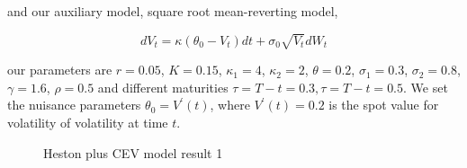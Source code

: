 \noindent and our auxiliary model, square root mean-reverting model,

$$
d V_t=\kappa(\theta_0 - V_t) d t+\sigma_0 \sqrt{V_t} d W_t
$$

\noindent our parameters are $r=0.05$, $K=0.15$, $\kappa_1=4$, $\kappa_2=2$, $\theta=0.2$, $\sigma_1=0.3$, $\sigma_2=0.8$, $\gamma=1.6$, $\rho=0.5$ and different maturities $\tau=T-t=0.3, \tau=T-t=0.5$. We set the nuisance parameters $\theta_0 = V^{\prime}(t)$, where $V^{\prime}(t)=0.2$ is the spot value for volatility of volatility at time $t$.

\begin{figure}[ht]
  \centering
  \hfill
  \caption{Heston plus CEV model result 1}
\end{figure}


